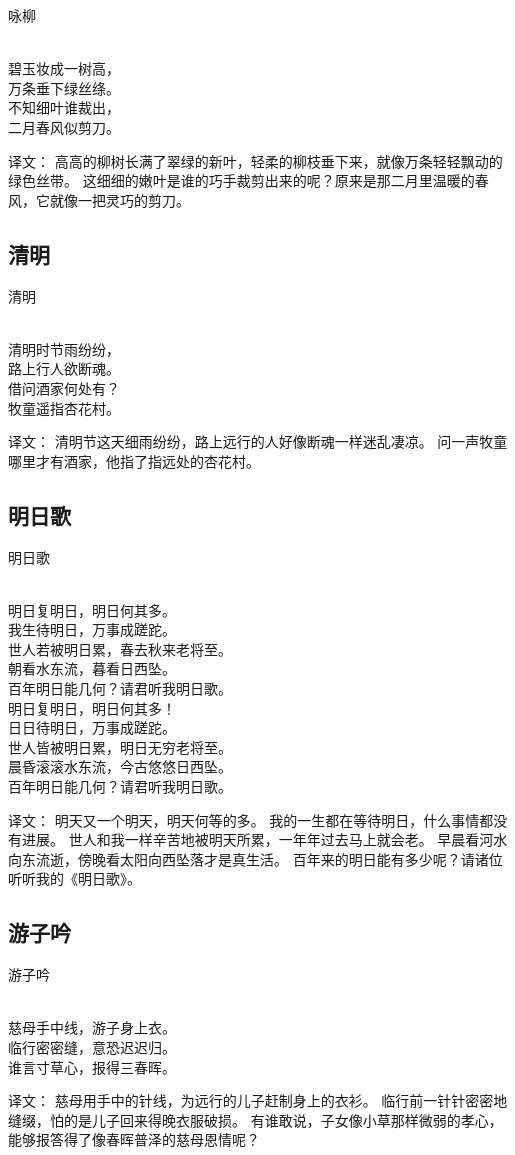 \noindent 咏柳

  \\

\noindent 碧玉妆成一树高，\\万条垂下绿丝绦。\\
不知细叶谁裁出，\\二月春风似剪刀。

译文：
高高的柳树长满了翠绿的新叶，轻柔的柳枝垂下来，就像万条轻轻飘动的绿色丝带。
这细细的嫩叶是谁的巧手裁剪出来的呢？原来是那二月里温暖的春风，它就像一把灵巧的剪刀。

\subsection{清明}

\noindent 清明

  \\

\noindent 清明时节雨纷纷，\\路上行人欲断魂。\\
借问酒家何处有？\\牧童遥指杏花村。

译文：
清明节这天细雨纷纷，路上远行的人好像断魂一样迷乱凄凉。
问一声牧童哪里才有酒家，他指了指远处的杏花村。

\subsection{明日歌}

\noindent 明日歌

  \\

\noindent 明日复明日，明日何其多。\\
我生待明日，万事成蹉跎。\\
世人若被明日累，春去秋来老将至。\\
朝看水东流，暮看日西坠。\\
百年明日能几何？请君听我明日歌。\\
明日复明日，明日何其多！\\
日日待明日，万事成蹉跎。\\
世人皆被明日累，明日无穷老将至。\\
晨昏滚滚水东流，今古悠悠日西坠。\\
百年明日能几何？请君听我明日歌。

译文：
明天又一个明天，明天何等的多。 我的一生都在等待明日，什么事情都没有进展。 世人和我一样辛苦地被明天所累，一年年过去马上就会老。 早晨看河水向东流逝，傍晚看太阳向西坠落才是真生活。 百年来的明日能有多少呢？请诸位听听我的《明日歌》。

\subsection{游子吟}

\noindent 游子吟

  \\

\noindent 慈母手中线，游子身上衣。\\
临行密密缝，意恐迟迟归。\\
谁言寸草心，报得三春晖。

译文：
慈母用手中的针线，为远行的儿子赶制身上的衣衫。
临行前一针针密密地缝缀，怕的是儿子回来得晚衣服破损。
有谁敢说，子女像小草那样微弱的孝心，能够报答得了像春晖普泽的慈母恩情呢？